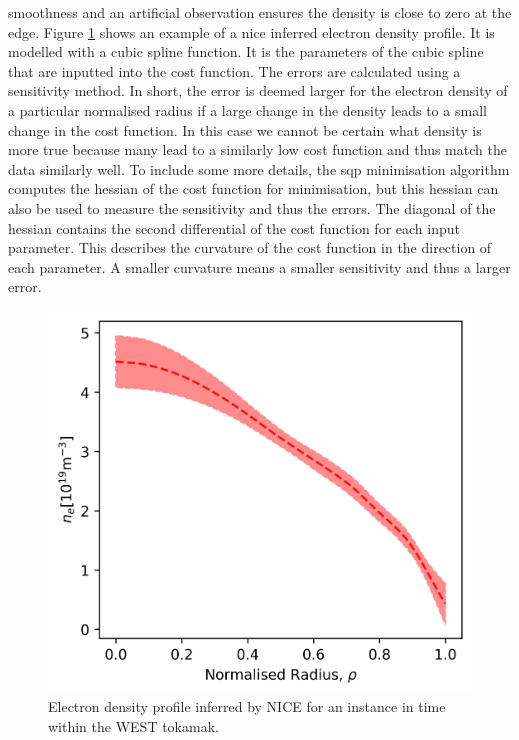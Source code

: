 smoothness and an artificial observation ensures the density is close to zero at the edge. Figure \ref{fig:nice_example} shows an example of a \gls{nice} inferred electron density profile. It is modelled with a cubic spline function. It is the parameters of the cubic spline that are inputted into the cost function. The errors are calculated using a sensitivity method. In short, the error is deemed larger for the electron density of a particular normalised radius if a large change in the density leads to a small change in the cost function. In this case we cannot be certain what density is more true because many lead to a similarly low cost function and thus match the data similarly well. To include some more details, the \gls{sqp} minimisation algorithm computes the hessian of the cost function for minimisation, but this hessian can also be used to measure the sensitivity and thus the errors. The diagonal of the hessian contains the second differential of the cost function for each input parameter. This describes the curvature of the cost function in the direction of each parameter. A smaller curvature means a smaller sensitivity and thus a larger error.

\begin{figure}
  \centering
  \includegraphics[width=13cm]{images/niceExample.png}
  \caption{Electron density profile inferred by NICE for an instance in time within the WEST tokamak.}
  \label{fig:nice_example}
\end{figure}

